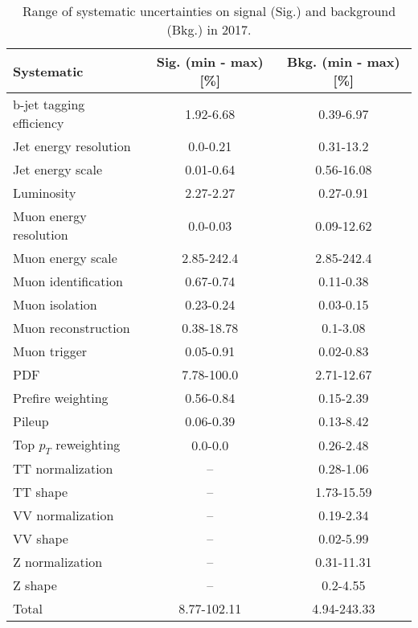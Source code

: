 \begin{table}[htbp]
\begin{center}
\caption{Range of systematic uncertainties on signal (Sig.) and background (Bkg.) in 2017.}
\begin{tabular}{lcc}
\hline\hline
Systematic				&  Sig. (min - max) [\%] &  Bkg. (min - max) [\%]  \\ \hline
b-jet tagging efficiency	& 1.92-6.68 & 0.39-6.97 \\
Jet energy resolution  	& 0.0-0.21 & 0.31-13.2 \\
Jet energy scale       	& 0.01-0.64 & 0.56-16.08 \\
Luminosity		 		& 2.27-2.27 & 0.27-0.91 \\
Muon energy resolution 	& 0.0-0.03 & 0.09-12.62 \\
Muon energy scale			& 2.85-242.4 & 2.85-242.4 \\
Muon identification		& 0.67-0.74 & 0.11-0.38 \\
Muon isolation			& 0.23-0.24 & 0.03-0.15 \\
Muon reconstruction		& 0.38-18.78 & 0.1-3.08 \\
Muon trigger				& 0.05-0.91 & 0.02-0.83 \\
PDF                    	& 7.78-100.0 & 2.71-12.67 \\
Prefire weighting			& 0.56-0.84 & 0.15-2.39 \\
Pileup                	& 0.06-0.39 & 0.13-8.42 \\
Top $p_T$ reweighting     & 0.0-0.0 & 0.26-2.48 \\
TT normalization       	& -- & 0.28-1.06 \\
TT shape               	& -- & 1.73-15.59 \\
VV normalization      	& -- & 0.19-2.34 \\
VV shape          		& -- & 0.02-5.99 \\
Z normalization        	& -- & 0.31-11.31 \\
Z shape                	& -- & 0.2-4.55 \\
Total                 	& 8.77-102.11 & 4.94-243.33 \\ \hline\hline
\end{tabular}
\label{tab:SysRanges2017}
\end{center}
\end{table}

